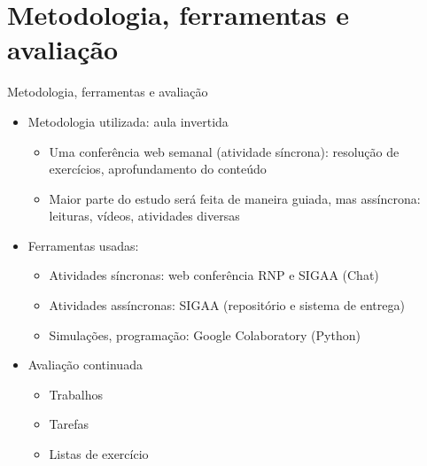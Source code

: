    \section[ slide = true]{Metodologia, ferramentas e avaliação}
      \begin{slide}[toc=]{Metodologia, ferramentas e avaliação}
         \begin{itemize}
	    \item Metodologia utilizada: aula invertida  
		    \begin{itemize}
			    \item Uma conferência web semanal (atividade síncrona): resolução de exercícios, aprofundamento do conteúdo
			    \item Maior parte do estudo será feita de maneira guiada, mas assíncrona: leituras, vídeos, atividades diversas
		    \end{itemize}
	    \item Ferramentas usadas:
		    \begin{itemize}
			    \item Atividades síncronas: web conferência RNP e SIGAA (Chat)
			    \item Atividades assíncronas: SIGAA (repositório e sistema de entrega)
			    \item Simulações, programação: Google Colaboratory (Python)
		    \end{itemize}

            \item Avaliação continuada
            \begin{itemize}
               \item Trabalhos 
               \item Tarefas 
	       \item Listas de exercício
	    \end{itemize}
	 \end{itemize}
      \end{slide}
      
